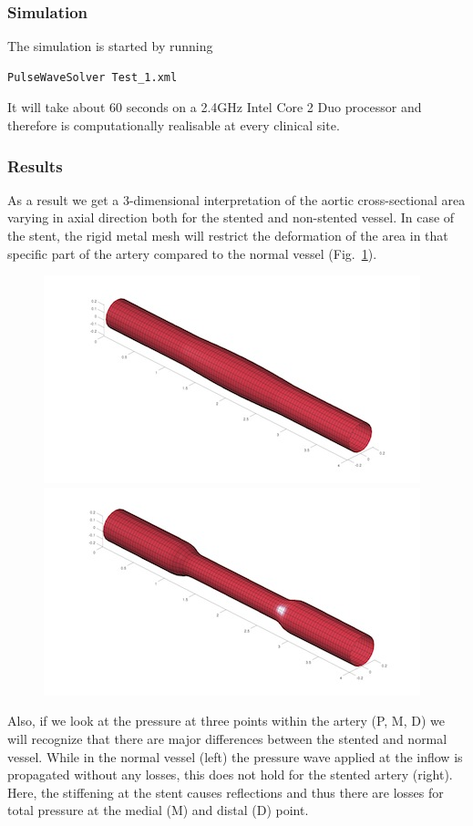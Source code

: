 \subsubsection{Simulation}
The simulation is started by running
\begin{lstlisting}[style=BashInputStyle]
PulseWaveSolver Test_1.xml
\end{lstlisting}
It will take about 60 seconds on a 2.4GHz Intel Core 2 Duo processor and 
therefore is computationally realisable at every clinical site.

\subsubsection{Results}
As a result we get a 3-dimensional interpretation of the aortic cross-sectional
area varying in axial direction both for the stented and non-stented vessel. In
case of the stent, the rigid metal mesh will restrict the deformation of the
area in that specific part of the artery compared to the normal vessel
(Fig.~\ref{f:pulsewave:stented:vessels}).

\begin{figure}
	\includegraphics[width=0.49\linewidth]{Figures/normal_vessel.jpg}
	\includegraphics[width=0.49\linewidth]{Figures/stented_vessel.jpg}
	\caption{}
	\label{f:pulsewave:stented:vessels}
\end{figure}

Also, if we look at the pressure at three points within the artery (P, M, D) we
will recognize that there are major differences between the stented and normal
vessel. While in the normal vessel (left) the pressure wave applied at the
inflow is propagated without any losses, this does not hold for the stented
artery (right). Here, the stiffening at the stent causes reflections and thus
there are losses for total pressure at the medial (M) and distal (D) point.

